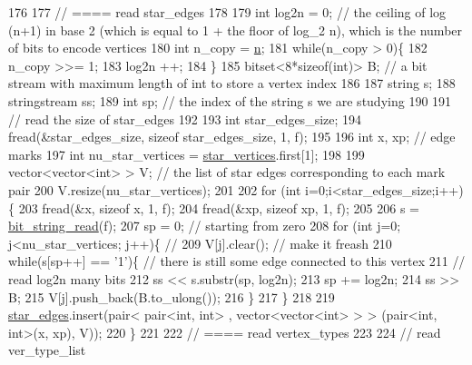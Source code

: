 \begin{DoxyCode}
176 
177   \textcolor{comment}{// ==== read star\_edges}
178 
179   \textcolor{keywordtype}{int} log2n = 0; \textcolor{comment}{// the ceiling of log (n+1) in base 2 (which is equal to 1 + the floor of log\_2 n), which
       is the number of bits to encode vertices}
180   \textcolor{keywordtype}{int} n\_copy = \hyperlink{classmarked__graph__compressed_a8d841016ddb11cfd33748c8deb6277ba}{n};
181   \textcolor{keywordflow}{while}(n\_copy > 0)\{
182     n\_copy >>= 1;
183     log2n ++;
184   \}
185   bitset<8*sizeof(int)> B; \textcolor{comment}{// a bit stream with maximum length of int to store a vertex index}
186 
187   \textcolor{keywordtype}{string} s;
188   stringstream ss;
189   \textcolor{keywordtype}{int} sp; \textcolor{comment}{// the index of the string s we are studying }
190 
191   \textcolor{comment}{// read the size of star\_edges}
192 
193   \textcolor{keywordtype}{int} star\_edges\_size;
194   fread(&star\_edges\_size, \textcolor{keyword}{sizeof} star\_edges\_size, 1, f);
195 
196   \textcolor{keywordtype}{int} x, xp; \textcolor{comment}{// edge marks}
197   \textcolor{keywordtype}{int} nu\_star\_vertices = \hyperlink{classmarked__graph__compressed_a7a4ced4586e2e353f9076bd447df5208}{star\_vertices}.first[1];
198 
199   vector<vector<int> > V; \textcolor{comment}{// the list of star edges corresponding to each mark pair}
200   V.resize(nu\_star\_vertices);
201 
202   \textcolor{keywordflow}{for} (\textcolor{keywordtype}{int} i=0;i<star\_edges\_size;i++)\{
203     fread(&x, \textcolor{keyword}{sizeof} x, 1, f);
204     fread(&xp, \textcolor{keyword}{sizeof} xp, 1, f);
205   
206     s = \hyperlink{compression__helper_8cpp_a40e8dcbc036f96b28e003e882c4890b7}{bit\_string\_read}(f);
207     sp = 0; \textcolor{comment}{// starting from zero }
208     \textcolor{keywordflow}{for} (\textcolor{keywordtype}{int} j=0; j<nu\_star\_vertices; j++)\{ \textcolor{comment}{// }
209       V[j].clear(); \textcolor{comment}{// make it freash}
210       \textcolor{keywordflow}{while}(s[sp++] == \textcolor{charliteral}{'1'})\{ \textcolor{comment}{// there is still some edge connected to this vertex }
211         \textcolor{comment}{// read log2n many bits}
212         ss << s.substr(sp, log2n);
213         sp += log2n;
214         ss >> B;
215         V[j].push\_back(B.to\_ulong());
216       \}
217     \}
218 
219     \hyperlink{classmarked__graph__compressed_a7df5779d313486644132bd816937f532}{star\_edges}.insert(pair< pair<int, int> , vector<vector<int> > > (pair<int, int>(x, xp), V));
220   \}
221 
222   \textcolor{comment}{// ==== read vertex\_types}
223 
224   \textcolor{comment}{// read ver\_type\_list}

\end{DoxyCode}
